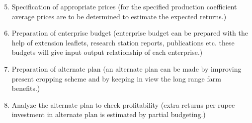 \documentclass[12pt,ignorenonframetext,aspectratio=169]{beamer}
\providecommand{\tightlist}{%
  \setlength{\itemsep}{0pt}\setlength{\parskip}{0pt}}
\begin{document}
\begin{frame}{}
\protect\hypertarget{section}{}
\begin{enumerate}
\setcounter{enumi}{4}
\tightlist
\item
  Specification of appropriate prices (for the specified production
  coefficient average prices are to be determined to estimate the
  expected returns.)
\item
  Preparation of enterprise budget (enterprise budget can be prepared
  with the help of extension leaflets, research station reports,
  publications etc. these budgets will give input output relationship of
  each enterprise.)
\item
  Preparation of alternate plan (an alternate plan can be made by
  improving present cropping scheme and by keeping in view the long
  range farm benefits.)
\item
  Analyze the alternate plan to check profitability (extra returns per
  rupee investment in alternate plan is estimated by partial budgeting.)
\end{enumerate}
\end{frame}
\end{document}
